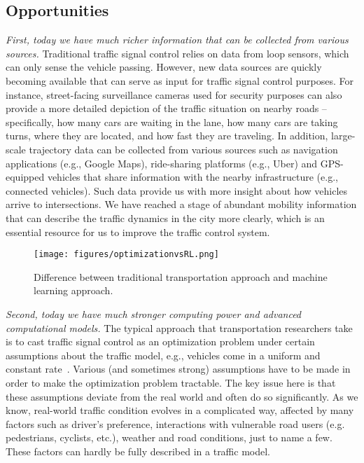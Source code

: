 \subsection{Opportunities}
\emph{First, today we have much richer information that can be collected from various sources.} Traditional traffic signal control relies on data from loop sensors, which can only sense the vehicle passing. However, new data sources are quickly becoming available that can serve as input for traffic signal control purposes. For instance, street-facing surveillance cameras used for security purposes can also provide a more detailed depiction of  the traffic situation on nearby roads -- specifically, how many cars are waiting in the lane, how many cars are taking turns, where they are located, and how fast they are traveling. In addition, large-scale trajectory data can be collected from various sources such as navigation applications (e.g., Google Maps),  ride-sharing platforms (e.g., Uber) and GPS-equipped vehicles that share information with the nearby infrastructure (e.g., connected vehicles). Such data provide us with more insight about how vehicles arrive to intersections. We have reached a stage of abundant mobility information that can describe the traffic dynamics in the city more clearly, which is an essential resource for us to improve the traffic control system.


 
\begin{figure}[htbp]
\centering
\texttt{[image: figures/optimizationvsRL.png]}
\caption{Difference between traditional transportation approach and machine learning approach.}
\label{fig:optvsrl}
\end{figure}

\emph{Second, today we have much stronger computing power and advanced computational models.} The typical approach that transportation researchers take is to cast traffic signal control as an optimization problem under certain assumptions about the traffic model, e.g., vehicles come in a uniform and constant rate~\cite{RPM04}.  Various (and sometimes strong) assumptions have to be made in order to make the optimization problem tractable. The key issue here is that these assumptions deviate from the real world and often do so significantly. As we know, real-world traffic condition evolves in a complicated way, affected by many factors such as driver's preference, interactions with vulnerable road users (e.g. pedestrians, cyclists, etc.), weather and road conditions, just to name a few. These factors can hardly be fully described in a traffic model.


